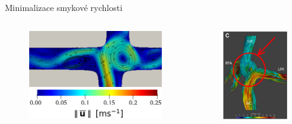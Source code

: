 \documentclass[aspectratio=169,xcolor=dvipsnames]{beamer}
\begin{document}
\begin{frame}{Minimalizace smykové rychlosti}
	\addtocounter{framenumber}{-1}
	\begin{columns}
		\begin{column}{.65\textwidth}
			\begin{figure}
				\vspace{2mm}
				\includegraphics[width=1.0\linewidth, trim={0 0 1cm 9mm}, clip]{Images/tcpc_dotgamma_veloc_a_streamlines.png}
				\\[7pt]
				\includegraphics[width=0.37	\textwidth]{Images/tcpc_dotgamma_veloc_legenda.png}
			\end{figure}
		\end{column}
		\begin{column}{.35\textwidth}
			\begin{figure}
				\renewcommand{\figurename}{Fontanovský oběh}
				\includegraphics[width=0.75\linewidth, trim={0 0 0 0mm}, clip]{Images/vortex.png}

\end{figure}
\end{column}
\end{columns}
\end{frame}
\end{document}
